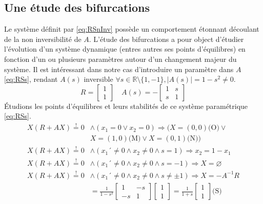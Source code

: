 \documentclass{wsdcr}
\begin{document}
\subsection{Une étude des bifurcations}
Le système définit par \ref{eq:RSnInv} possède un comportement étonnant découlant de la non inversibilité de $A$. L'étude des bifurcations a pour object d'étudier l'évolution d'un système dynamique (entres autres ses points d'équilibres) en fonction d'un ou plusieurs paramètres autour d'un changement majeur du système. Il est intéressant dans notre cas d'introduire un paramètre dans $A$ \ref{eq:RSs}, rendant $A(s)$ inversible $\forall s \in \mathds{R}\setminus \{1,-1\}, |A(s)|=1-s^2 \neq 0 $.
\begin{equation}
R={\begin{bmatrix}1\\1\end{bmatrix}}\quad A(s) =-{\begin{bmatrix}1&s\\s&1\end{bmatrix}}
\label{eq:RSs}
\end{equation}
Étudions les points d'équilibres et leurs stabilités de ce système paramétrique \ref{eq:RSs}. 
\begin{equation}
\begin{aligned}
X(R+AX)\overset{!}{=}0 &\land (x_1 = 0 \lor x_2 = 0) \Rightarrow (X=(0,0) \text{(O)} \lor \\ &X=(1,0) \text{(M)}\lor X=(0,1) \text{(N)})\\
X(R+AX)\overset{!}{=}0 &\land (x_1 ´\neq 0 \land x_2 \neq 0 \land s=1) \Rightarrow x_2=1-x_1 \\
X(R+AX)\overset{!}{=}0 &\land (x_1 ´\neq 0 \land x_2 \neq 0 \land s=-1) \Rightarrow X=\varnothing \\
X(R+AX)\overset{!}{=}0 &\land (x_1 ´\neq 0 \land x_2 \neq 0 \land s \neq \pm 1) \Rightarrow X=-A^{-1}R \\ &=\frac{1}{1-s^2}\begin{bmatrix}1&-s\\-s&1\end{bmatrix}\begin{bmatrix}1\\1\end{bmatrix}=\frac{1}{1+s}\begin{bmatrix}1\\1\end{bmatrix} \text{(S)}
\end{aligned}
\label{eq:RSs}
\end{equation}
\end{document}
